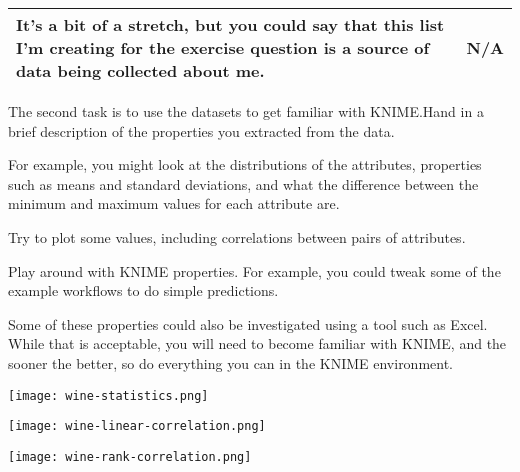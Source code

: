 \documentclass[
  coursecode={CSIC/CMPE 251},
  assignmentname={Exercise 1},
  studentnumber=20053722,
  name={Bryan Hoang}
]{
  ltxanswer%
}
\begin{document}
\begin{questions}
\begin{solution}
\begin{center}
\begin{tabularx}{\textwidth}{
            >{\raggedright\arraybackslash}X
            >{\raggedright\arraybackslash}X}
          \midrule
          It's a bit of a stretch, but you could say that this list I'm creating  for the exercise question is a source of data being collected about me. & N/A                                                                                                                                                                                                                                                                                                                                                                                   \\
          \bottomrule
        \end{tabularx}
      \end{center}
    \end{solution}

    \question[2]{}
    The second task is to use the datasets to get familiar with KNIME.\@ Hand in a brief description of the properties you extracted from the data.

    For example, you might look at the distributions of the attributes, properties such as means and standard deviations, and what the difference between the minimum and maximum values for each attribute are.

    Try to plot some values, including correlations between pairs of attributes.

    Play around with KNIME properties. For example, you could tweak some of the example workflows to do simple predictions.

    Some of these properties could also be investigated using a tool such as Excel. While that is acceptable, you will need to become familiar with KNIME, and the sooner the better, so do everything you can in the KNIME environment.
    \begin{solution}
      \newpage
      \captionsetup{type=figure}
      \begin{center}
        \texttt{[image: wine-statistics.png]}
        \label{fig:wine-stat}
      \end{center}
      \newpage
      \begin{center}
        \texttt{[image: wine-linear-correlation.png]}
        \label{fig:wine-lin-regress}
      \end{center}
      \newpage
      \begin{center}
        \texttt{[image: wine-rank-correlation.png]}
        \label{fig:wine-rank-regress}
      \end{center}
    \end{solution}
  \end{questions}
\end{document}
